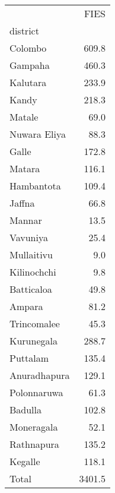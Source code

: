 \begin{tabular}{lr}
\toprule
{} &    FIES \\
district     &         \\
\midrule
Colombo      &   609.8 \\
Gampaha      &   460.3 \\
Kalutara     &   233.9 \\
Kandy        &   218.3 \\
Matale       &    69.0 \\
Nuwara Eliya &    88.3 \\
Galle        &   172.8 \\
Matara       &   116.1 \\
Hambantota   &   109.4 \\
Jaffna       &    66.8 \\
Mannar       &    13.5 \\
Vavuniya     &    25.4 \\
Mullaitivu   &     9.0 \\
Kilinochchi  &     9.8 \\
Batticaloa   &    49.8 \\
Ampara       &    81.2 \\
Trincomalee  &    45.3 \\
Kurunegala   &   288.7 \\
Puttalam     &   135.4 \\
Anuradhapura &   129.1 \\
Polonnaruwa  &    61.3 \\
Badulla      &   102.8 \\
Moneragala   &    52.1 \\
Rathnapura   &   135.2 \\
Kegalle      &   118.1 \\
Total        &  3401.5 \\
\bottomrule
\end{tabular}
